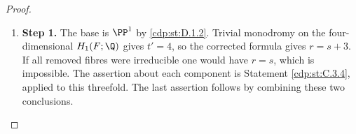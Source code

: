 \begin{proof}
\begin{enumerate}[label={$\langle1\rangle$\arabic*.},leftmargin=*]
\item 
\noindent\textbf{Step 1.} The base is $\PP^1$ by \ref{cdp:st:D.1.2}. Trivial monodromy on the
four-dimensional $H_1(F;\Q)$ gives $t'=4$, so the corrected formula
gives $r=s+3$. If all removed fibres were irreducible one would have
$r=s$, which is impossible. The assertion about each component is
Statement \ref{cdp:st:C.3.4}, applied to this threefold. The last assertion follows
by combining these two conclusions.

\end{enumerate}
\end{proof}
